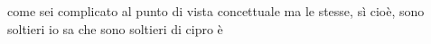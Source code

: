 \begin{soluzione}
{come sei complicato al punto di vista concettuale ma le stesse, sì cioè, sono soltieri io sa che sono soltieri di cipro è}
\end{soluzione}

\setcounter{equation}{0}